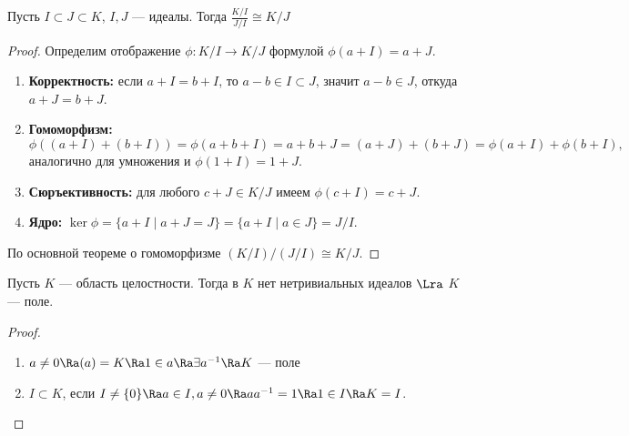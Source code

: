 \begin{theorem}
    Пусть \(I \subset J \subset K\), \(I, J\) --- идеалы. Тогда \(\frac{K/I}{J/I} \cong K/J\)
\end{theorem}
\begin{proof}
    Определим отображение \(\phi: K/I \to K/J\) формулой \(\phi(a+I) = a+J\).
    \begin{enumerate}
        \item \textbf{Корректность:} если \(a+I = b+I\), то \(a-b \in I \subset J\), значит \(a-b \in J\), откуда \(a+J = b+J\).
        \item \textbf{Гомоморфизм:} 
        \[
        \phi((a+I)+(b+I)) = \phi(a+b+I) = a+b+J = (a+J)+(b+J) = \phi(a+I)+\phi(b+I),
        \]
        аналогично для умножения и \(\phi(1+I)=1+J\).
        \item \textbf{Сюръективность:} для любого \(c+J \in K/J\) имеем \(\phi(c+I)=c+J\).
        \item \textbf{Ядро:} \(\ker\phi = \{a+I \mid a+J = J\} = \{a+I \mid a \in J\} = J/I\).
    \end{enumerate}
    По основной теореме о гомоморфизме \((K/I)/(J/I) \cong K/J\).
\end{proof}

\begin{proposition}
    Пусть \(K\) --- область целостности. Тогда в \(K\) нет нетривиальных идеалов \(\Lra\) \(K\) --- поле.
\end{proposition}
\begin{proof}
    \begin{enumerate}
        \item[\(\Ra\)] \(a \ne 0 \Ra (a) = K \Ra 1 \in a \Ra \exists a^{-1} \Ra K\) --- поле
        \item[\(\La\)] \(I \subset K\), если \(I \ne \{0\} \Ra a \in I, a \ne 0 \Ra aa^{-1} = 1 \Ra 1 \in I \Ra K = I\).
    \end{enumerate}
\end{proof}

